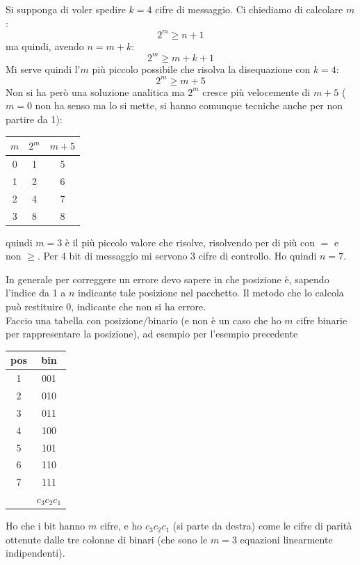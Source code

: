 \documentclass[a4paper,12pt, oneside]{book}
\begin{document}
\begin{esempio}
  Si supponga di voler spedire $k=4$ cifre di messaggio. Ci chiediamo di
  calcolare $m$:
  \[2^m\geq n+1\]
  ma quindi, avendo $n=m+k$:
  \[2^m\geq m+k+1\]
  Mi serve quindi l'$m$ più piccolo possibile che risolva la disequazione con
  $k=4$: 
  \[2^m\geq m+5\]
  Non si ha però una soluzione analitica ma $2^m$ cresce più velocemente di
  $m+5$ ($m=0$ non ha senso ma lo si mette, si hanno comunque tecniche anche per
  non partire da 1):
  \begin{table}[H]
    \centering
    \begin{tabular}{c||c|c}
      $m$& $2^m$ & $m+5$\\
      \hline
      \hline
      0 & 1 & 5\\
      1 & 2 & 6\\
      2 & 4 & 7\\
      3 & 8 & 8
    \end{tabular}
  \end{table}
  quindi $m=3$ è il più piccolo valore che risolve, risolvendo per di più con
  $=$ e non $\geq$. Per 4 bit di messaggio mi servono 3 cifre di controllo. Ho
  quindi $n=7$.
\end{esempio}
In generale per correggere un errore devo sapere in che posizione è, sapendo
l'indice da 1 a $n$ indicante tale posizione nel pacchetto. Il metodo che lo
calcola può restituire 0, indicante che non si ha errore.\\
Faccio una tabella con posizione/binario (e non è un caso che ho $m$ cifre
binarie per rappresentare la posizione), ad esempio per l'esempio precedente
\begin{table}[H]
  \centering
  \begin{tabular}{c|c}
    pos& bin \\
    \hline     
    1 & 001\\
    2 & 010\\
    3 &011\\
    4&100\\
    5&101\\
    6&110\\
    7&111\\
    \hline
    \hline
    &   $c_3c_2c_1$
  \end{tabular}
\end{table}
Ho che i bit hanno $m$ cifre, e ho $c_3c_2c_1$ (si parte da destra) come le
cifre di parità ottenute dalle tre colonne di binari (che sono le $m=3$
equazioni linearmente indipendenti).\\
\end{document}
